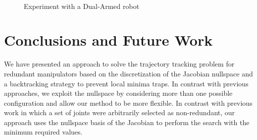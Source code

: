 \documentclass[conference]{IEEEtran}
\begin{document}
\begin{figure}[]
  \centering
  \\
  \caption{ Experiment with a Dual-Armed robot}
  \label{fig:Experiment4_LWA4}
\end{figure}

\section{Conclusions and Future Work}
\label{sec:Conclusions}
We have presented an approach to solve the trajectory tracking
problem for redundant manipulators based on the discretization of the Jacobian nullspace
and a backtracking strategy to prevent local minima traps. In contrast
with previous approaches, we exploit the nullspace by considering more than one possible
configuration and allow our method to be more flexible. In contrast with previous
work in which a set of joints were arbitrarily selected as non-redundant, our approach 
uses the nullspace basis of the Jacobian to perform the search with the minimum required
values.
\end{document}

